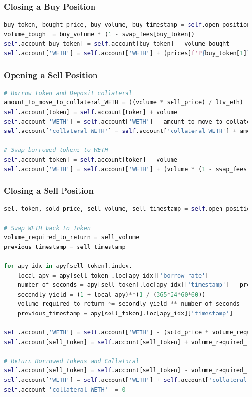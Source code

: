 \subsubsection{Closing a Buy Position}
\begin{lstlisting}[language=Python, caption={Execution code for closing a buy positon},captionpos=b]
buy_token, bought_price, buy_volume, buy_timestamp = self.open_positions['BUY'][buy_id]
volume_bought = buy_volume * (1 - swap_fees[buy_token])
self.account[buy_token] = self.account[buy_token] - volume_bought
self.account['WETH'] = self.account['WETH'] + (prices[f'P{buy_token[1]}'] * (volume_bought * (1 - swap_fees[buy_token])))
\end{lstlisting}


\subsubsection{Opening a Sell Position}
\begin{lstlisting}[language=Python, caption={Execution code for opening a sell positon},captionpos=b]
# Borrow token and Deposit collateral
amount_to_move_to_collateral_WETH = ((volume * sell_price) / ltv_eth)
self.account[token] = self.account[token] + volume
self.account['WETH'] = self.account['WETH'] - amount_to_move_to_collateral_WETH
self.account['collateral_WETH'] = self.account['collateral_WETH'] + amount_to_move_to_collateral_WETH

# Swap borrowed tokens to WETH
self.account[token] = self.account[token] - volume
self.account['WETH'] = self.account['WETH'] + (volume * (1 - swap_fees[token]) * sell_price)
\end{lstlisting}


\subsubsection{Closing a Sell Position}
\begin{lstlisting}[language=Python, caption={Execution code for closing a sell positon},captionpos=b]
sell_token, sold_price, sell_volume, sell_timestamp = self.open_positions['SELL'][sell_id]

# Swap WETH back to Token
volume_required_to_return = sell_volume
previous_timestamp = sell_timestamp

for apy_idx in apy[sell_token].index:
    local_apy = apy[sell_token].loc[apy_idx]['borrow_rate']
    number_of_seconds = apy[sell_token].loc[apy_idx]['timestamp'] - previous_timestamp
    secondly_yield = (1 + local_apy)**(1 / (365*24*60*60))
    volume_required_to_return *= secondly_yield ** number_of_seconds
    previous_timestamp = apy[sell_token].loc[apy_idx]['timestamp']

self.account['WETH'] = self.account['WETH'] - (sold_price * volume_required_to_return / (1 - swap_fees[sell_token])) 
self.account[sell_token] = self.account[sell_token] + volume_required_to_return

# Return Borrowed Tokens and Collatoral
self.account[sell_token] = self.account[sell_token] - volume_required_to_return
self.account['WETH'] = self.account['WETH'] + self.account['collateral_WETH']
self.account['collateral_WETH'] = 0
\end{lstlisting}

